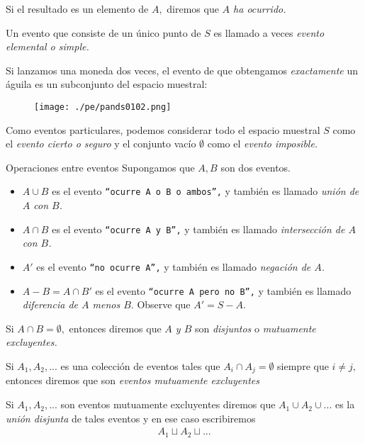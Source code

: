 Si el resultado es un elemento de $A,$ diremos que \emph{$A$ ha ocurrido.} 

Un evento que consiste de un único punto de $S$ es llamado a veces \emph{evento elemental o simple.}

{}
\begin{exmp}
 \label{exmp:1.8}
 Si lanzamos una moneda dos veces, el evento de que obtengamos \emph{exactamente} un águila  es un subconjunto del espacio muestral:
 
 \begin{figure}[h]
 \centering
 \texttt{[image: ./pe/pands0102.png]}
 \label{pands0102}
\end{figure}

\end{exmp}


{}
Como eventos particulares, podemos considerar todo el espacio muestral $S$ como el \emph{evento cierto o seguro} y el conjunto vacío $\emptyset$ como el \emph{evento imposible.}


{Operaciones entre eventos} Supongamos que $A,B$ son dos eventos. 
\begin{itemize}
 \item $A\cup B$ es el evento \texttt{``ocurre $A$ o $B$ o ambos'',} y también es llamado \emph{unión de $A$ con $B$.}  
 \item $A\cap B$ es el evento \texttt{``ocurre $A$ y $B$'',} y también es llamado \emph{intersección de $A$ con $B$.}  
 \item $A'$ es el evento \texttt{``no ocurre $A$'',} y también es llamado \emph{negación de $A$.} 
 \item $A-B=A\cap B'$ es el evento \texttt{``ocurre $A$ pero no $B$'',} y también es llamado \emph{diferencia de $A$ menos $B.$}  Observe que
 $A' = S - A.$
\end{itemize}

{}
 Si $A\cap B= \emptyset,$ entonces diremos que \emph{$A$ y $B$} son \emph{disjuntos} o \emph{mutuamente excluyentes.} 

 \begin{defn}
  Si $A_{1},A_{2},...$ es una colección de eventos tales que $A_{i}\cap A_{j}=\emptyset$ siempre que $i\neq j,$ entonces diremos que son \emph{eventos mutuamente excluyentes}
 \end{defn}

 


 \begin{defn}
  Si $A_{1}, A_{2}, ...$ son eventos mutuamente excluyentes diremos que $A_{1} \cup A_{2} \cup ... $ es la \emph{unión disjunta} de tales eventos y en ese caso escribiremos
  \begin{align*}
A_{1}\sqcup A_{2} \sqcup ...
\end{align*}
 \end{defn}



